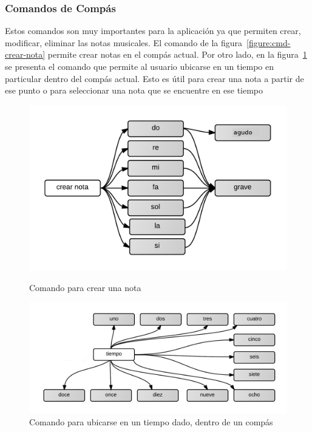 \subsubsection{Comandos de Comp\'as}

Estos comandos son muy importantes para la aplicaci\'on ya que permiten crear, modificar, 
eliminar las notas musicales. El comando de la figura~\ref{figure:cmd-crear-nota} permite crear notas en el  
comp\'as actual. Por otro lado, en la figura~\ref{figure:cmd-tiempo-compas} se presenta el comando que permite al usuario ubicarse en un  
tiempo en particular dentro del comp\'as actual. Esto es \'util para crear una nota a partir de ese punto o 
para seleccionar una nota que se encuentre en ese tiempo

\begin{figure}[H]
\begin{minipage}[b]{0.5\linewidth}
\centering
\includegraphics[width=1\linewidth]{./graphics/cmd-crear-nota.png}
\caption{Comando para crear una nota}
\label{figure:cmd-crear-nota}
\end{minipage}
\quad
\begin{minipage}[b]{0.5\linewidth}
\centering
\includegraphics[width=1.1\linewidth]{./graphics/cmd-tiempo-compas.png}
\caption{Comando para ubicarse en un tiempo dado, dentro de un comp\'as}
\label{figure:cmd-tiempo-compas}
\end{minipage}
\end{figure}

